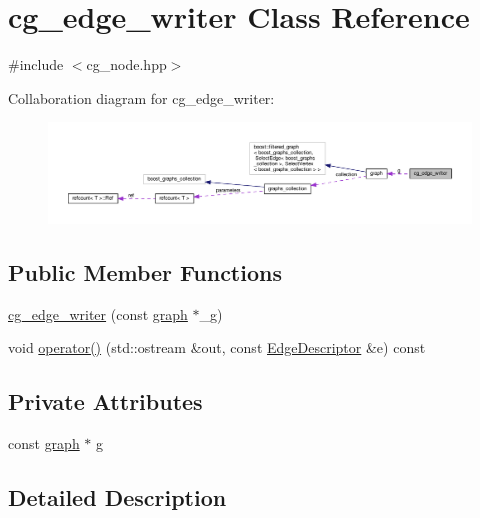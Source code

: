 \hypertarget{classcg__edge__writer}{}\section{cg\+\_\+edge\+\_\+writer Class Reference}
\label{classcg__edge__writer}


{\ttfamily \#include $<$cg\+\_\+node.\+hpp$>$}



Collaboration diagram for cg\+\_\+edge\+\_\+writer\+:
\nopagebreak
\begin{figure}[H]
\begin{center}
\leavevmode
\includegraphics[width=350pt]{d5/dc1/classcg__edge__writer__coll__graph}
\end{center}
\end{figure}
\subsection*{Public Member Functions}
\begin{DoxyCompactItemize}
\item 
\hyperlink{classcg__edge__writer_af5dd28b83c9546f86749eb3d380e2581}{cg\+\_\+edge\+\_\+writer} (const \hyperlink{structgraph}{graph} $\ast$\+\_\+g)
\item 
void \hyperlink{classcg__edge__writer_a58cc1053c3492554ccad8e6eb2dea459}{operator()} (std\+::ostream \&out, const \hyperlink{graph_8hpp_a9eb9afea34e09f484b21f2efd263dd48}{Edge\+Descriptor} \&e) const
\end{DoxyCompactItemize}
\subsection*{Private Attributes}
\begin{DoxyCompactItemize}
\item 
const \hyperlink{structgraph}{graph} $\ast$ \hyperlink{classcg__edge__writer_a8b5beeba80a344f33fa5bf127b244f2f}{g}
\end{DoxyCompactItemize}


\subsection{Detailed Description}


